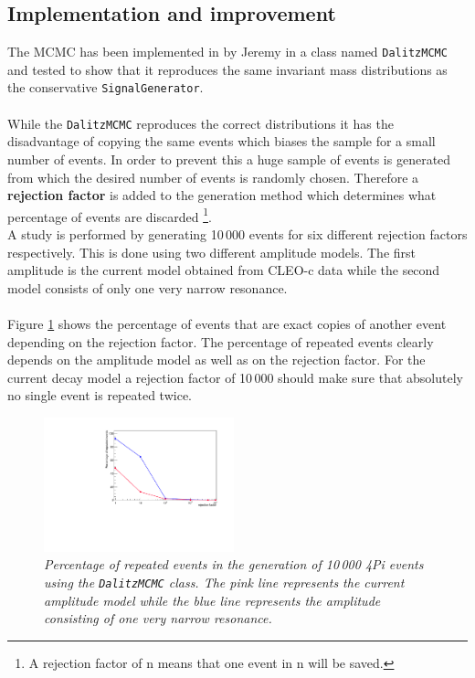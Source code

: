 \subsection{Implementation and improvement}
The MCMC has been implemented in \mint by Jeremy in a class named \texttt{DalitzMCMC} and tested to show that it reproduces the same invariant mass distributions as the conservative \texttt{SignalGenerator}.\\
\\
While the \texttt{DalitzMCMC} reproduces the correct distributions it has the disadvantage of copying the same events which biases the sample for a small number of events. In order to prevent this a huge sample of events is generated from which the desired number of events is randomly chosen. Therefore a \textbf{rejection factor} is added to the generation method which determines what percentage of events are discarded \footnote{A rejection factor of n means that one event in n will be saved.}.\\
A study is performed by generating 10\,000 events for six different rejection factors respectively. This is done using two different amplitude models. The first amplitude is the current \Dz model obtained from CLEO-c data while the second model consists of only one very narrow resonance.\\
\\
Figure \ref{fig:rep} shows the percentage of events that are exact copies of another event depending on the rejection factor. The percentage of repeated events clearly depends on the amplitude model as well as on the rejection factor. For the current \Dz decay model a rejection factor of 10\,000 should make sure that absolutely no single event is repeated twice.\\
\begin{figure}[!h]
\vspace*{-0.cm}
  \begin{center}
 \includegraphics[width=0.49\textwidth]{repeat.pdf}
  \vspace*{-0.5cm}
  \end{center}
  \caption{\textit{Percentage of repeated events in the generation of 10\,000 \DzTo4Pi events using the \texttt{DalitzMCMC} class. The pink line represents the current \Dz amplitude model while the blue line represents the amplitude consisting of one very narrow resonance.}}
  \label{fig:rep}
\end{figure}

